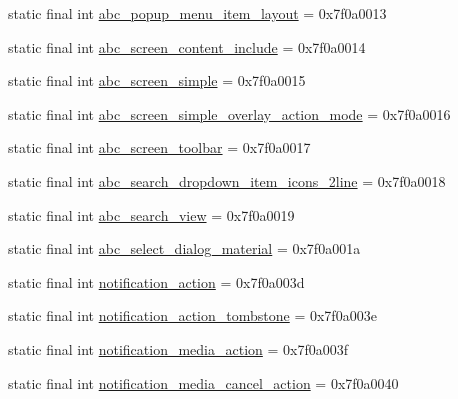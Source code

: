 \begin{DoxyCompactItemize}
\item 
static final int \mbox{\hyperlink{classandroid_1_1support_1_1v7_1_1appcompat_1_1R_1_1layout_ac9b2ae8449ac46de21fed2f9864afbc3}{abc\+\_\+popup\+\_\+menu\+\_\+item\+\_\+layout}} = 0x7f0a0013
\item 
static final int \mbox{\hyperlink{classandroid_1_1support_1_1v7_1_1appcompat_1_1R_1_1layout_a1193e05438a3988d8cebb0a4810fabc1}{abc\+\_\+screen\+\_\+content\+\_\+include}} = 0x7f0a0014
\item 
static final int \mbox{\hyperlink{classandroid_1_1support_1_1v7_1_1appcompat_1_1R_1_1layout_a46cabee4c1c1c293c63a99e850973847}{abc\+\_\+screen\+\_\+simple}} = 0x7f0a0015
\item 
static final int \mbox{\hyperlink{classandroid_1_1support_1_1v7_1_1appcompat_1_1R_1_1layout_acc248e0178ddf81d8ec0eb5056424a5d}{abc\+\_\+screen\+\_\+simple\+\_\+overlay\+\_\+action\+\_\+mode}} = 0x7f0a0016
\item 
static final int \mbox{\hyperlink{classandroid_1_1support_1_1v7_1_1appcompat_1_1R_1_1layout_addd57f53331cb1ff5fd2c53e61bf2805}{abc\+\_\+screen\+\_\+toolbar}} = 0x7f0a0017
\item 
static final int \mbox{\hyperlink{classandroid_1_1support_1_1v7_1_1appcompat_1_1R_1_1layout_a43434db42002b5872fd031eaaea46488}{abc\+\_\+search\+\_\+dropdown\+\_\+item\+\_\+icons\+\_\+2line}} = 0x7f0a0018
\item 
static final int \mbox{\hyperlink{classandroid_1_1support_1_1v7_1_1appcompat_1_1R_1_1layout_a424314fba766e6fc9c6e6b71ccc00fff}{abc\+\_\+search\+\_\+view}} = 0x7f0a0019
\item 
static final int \mbox{\hyperlink{classandroid_1_1support_1_1v7_1_1appcompat_1_1R_1_1layout_a1f6651d158db2337019984ab97f60e22}{abc\+\_\+select\+\_\+dialog\+\_\+material}} = 0x7f0a001a
\item 
static final int \mbox{\hyperlink{classandroid_1_1support_1_1v7_1_1appcompat_1_1R_1_1layout_afe7cf82e60de09f99402960853d3ee0f}{notification\+\_\+action}} = 0x7f0a003d
\item 
static final int \mbox{\hyperlink{classandroid_1_1support_1_1v7_1_1appcompat_1_1R_1_1layout_a65fed226da4d733de3068d4a15cc5b55}{notification\+\_\+action\+\_\+tombstone}} = 0x7f0a003e
\item 
static final int \mbox{\hyperlink{classandroid_1_1support_1_1v7_1_1appcompat_1_1R_1_1layout_a07b16aa60214e640ee520c3949ca8ebf}{notification\+\_\+media\+\_\+action}} = 0x7f0a003f
\item 
static final int \mbox{\hyperlink{classandroid_1_1support_1_1v7_1_1appcompat_1_1R_1_1layout_a4942be2a18b0c69205d2f039f4cfb25d}{notification\+\_\+media\+\_\+cancel\+\_\+action}} = 0x7f0a0040

\end{DoxyCompactItemize}
